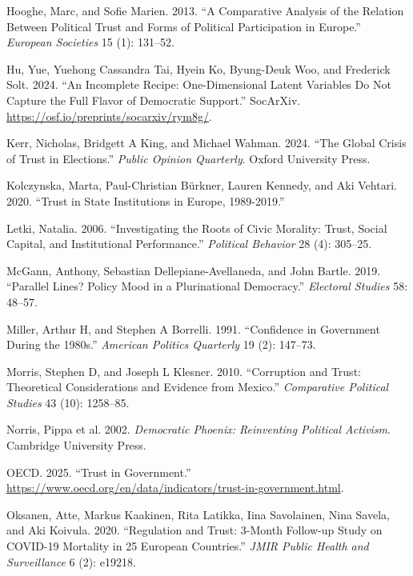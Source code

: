 \documentclass[
  12pt,
]{article}
\newlength{\cslhangindent}
\newenvironment{CSLReferences}[2] %
 {\begin{list}{}{%
  \setlength{\itemindent}{0pt}
  \setlength{\leftmargin}{0pt}
  \setlength{\parsep}{0pt}
  \ifodd #1
   \setlength{\leftmargin}{\cslhangindent}
   \setlength{\itemindent}{-1\cslhangindent}
  \fi
  \setlength{\itemsep}{#2\baselineskip}}}
 {\end{list}}
\begin{document}
\begin{CSLReferences}{1}{0}
Hooghe, Marc, and Sofie Marien. 2013. {``A Comparative Analysis of the Relation Between Political Trust and Forms of Political Participation in Europe.''} \emph{European Societies} 15 (1): 131--52.

Hu, Yue, Yuehong Cassandra Tai, Hyein Ko, Byung-Deuk Woo, and Frederick Solt. 2024. {``An Incomplete Recipe: One-Dimensional Latent Variables Do Not Capture the Full Flavor of Democratic Support.''} SocArXiv. \url{https://osf.io/preprints/socarxiv/rym8g/}.

Kerr, Nicholas, Bridgett A King, and Michael Wahman. 2024. {``The Global Crisis of Trust in Elections.''} \emph{Public Opinion Quarterly}. Oxford University Press.

Kolczynska, Marta, Paul-Christian Bürkner, Lauren Kennedy, and Aki Vehtari. 2020. {``Trust in State Institutions in Europe, 1989-2019.''}

Letki, Natalia. 2006. {``Investigating the Roots of Civic Morality: Trust, Social Capital, and Institutional Performance.''} \emph{Political Behavior} 28 (4): 305--25.

McGann, Anthony, Sebastian Dellepiane-Avellaneda, and John Bartle. 2019. {``Parallel Lines? Policy Mood in a Plurinational Democracy.''} \emph{Electoral Studies} 58: 48--57.

Miller, Arthur H, and Stephen A Borrelli. 1991. {``Confidence in Government During the 1980s.''} \emph{American Politics Quarterly} 19 (2): 147--73.

Morris, Stephen D, and Joseph L Klesner. 2010. {``Corruption and Trust: Theoretical Considerations and Evidence from Mexico.''} \emph{Comparative Political Studies} 43 (10): 1258--85.

Norris, Pippa et al. 2002. \emph{Democratic Phoenix: Reinventing Political Activism}. Cambridge University Press.

OECD. 2025. {``Trust in Government.''} \url{https://www.oecd.org/en/data/indicators/trust-in-government.html}.

Oksanen, Atte, Markus Kaakinen, Rita Latikka, Iina Savolainen, Nina Savela, and Aki Koivula. 2020. {``Regulation and Trust: 3-Month Follow-up Study on COVID-19 Mortality in 25 European Countries.''} \emph{JMIR Public Health and Surveillance} 6 (2): e19218.


\end{CSLReferences}
\end{document}
